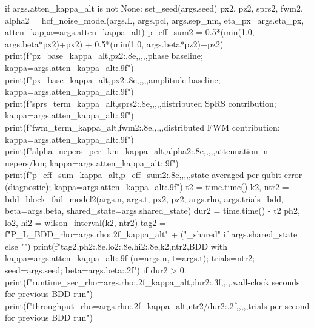 {{{{        if args.atten_kappa_alt is not None:
            set_seed(args.seed)
            px2, pz2, sprs2, fwm2, alpha2 = hcf_noise_model(args.L, args.pcl, args.sep_nm,
                                                             eta_px=args.eta_px, atten_kappa=args.atten_kappa_alt)
            p_eff_sum2 = 0.5*(min(1.0, args.beta*px2)+px2) + 0.5*(min(1.0, args.beta*pz2)+pz2)
            print(f"pz_base_kappa_alt,{pz2:.8e},,,,,phase baseline; kappa={args.atten_kappa_alt:.9f}")
            print(f"px_base_kappa_alt,{px2:.8e},,,,,amplitude baseline; kappa={args.atten_kappa_alt:.9f}")
            print(f"sprs_term_kappa_alt,{sprs2:.8e},,,,,distributed SpRS contribution; kappa={args.atten_kappa_alt:.9f}")
            print(f"fwm_term_kappa_alt,{fwm2:.8e},,,,,distributed FWM contribution; kappa={args.atten_kappa_alt:.9f}")
            print(f"alpha_nepers_per_km_kappa_alt,{alpha2:.8e},,,,,attenuation in nepers/km; kappa={args.atten_kappa_alt:.9f}")
            print(f"p_eff_sum_kappa_alt,{p_eff_sum2:.8e},,,,,state-averaged per-qubit error (diagnostic); kappa={args.atten_kappa_alt:.9f}")
            t2 = time.time()
            k2, ntr2 = bdd_block_fail_model2(args.n, args.t, px2, pz2, args.rho, args.trials_bdd,
                                             beta=args.beta, shared_state=args.shared_state)
            dur2 = time.time() - t2
            ph2, lo2, hi2 = wilson_interval(k2, ntr2)
            tag2 = f"P_L_BDD_rho={args.rho:.2f}_kappa_alt" + ("_shared" if args.shared_state else "")
            print(f"{tag2},{ph2:.8e},{lo2:.8e},{hi2:.8e},{k2},{ntr2},BDD with kappa={args.atten_kappa_alt:.9f} (n={args.n}, t={args.t}); trials={ntr2}; seed={args.seed}; beta={args.beta:.2f}")
            if dur2 > 0:
                print(f"runtime_sec_rho={args.rho:.2f}_kappa_alt,{dur2:.3f},,,,,wall-clock seconds for previous BDD run")
                print(f"throughput_rho={args.rho:.2f}_kappa_alt,{ntr2/dur2:.2f},,,,,trials per second for previous BDD run")

}}}}
